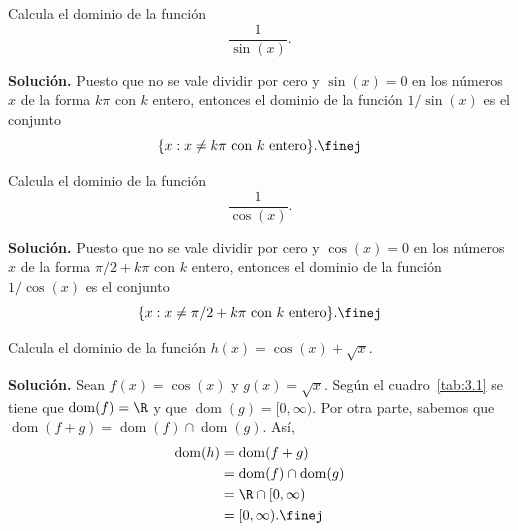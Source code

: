 \documentclass[12pt,a4paper]{book}
\DeclareMathOperator{\dom}{dom}
\begin{document}
    \begin{ejemplo}\label{ejm:15}
        Calcula el dominio de la función
        \begin{equation*}
            \frac{1}{\sin(x)}.
        \end{equation*}

        \textbf{Solución.} Puesto que no se vale dividir por cero y $\sin(x)=0$ en los
        números $x$ de la forma $k\pi$ con $k$ entero, entonces el dominio de la función
        $1/\sin(x)$ es el conjunto
        \begin{equation*}
            \{x:x\neq k\pi\text{ con }k\text{ entero}\}.\finej
        \end{equation*}
    \end{ejemplo}

    \begin{ejemplo}\label{ejm:16}
        Calcula el dominio de la función
        \begin{equation*}
            \frac{1}{\cos(x)}.
        \end{equation*}

        \textbf{Solución.} Puesto que no se vale dividir por cero y $\cos(x)=0$ en los
        números $x$ de la forma $\pi/2+k\pi$ con $k$ entero, entonces el dominio de la
        función $1/\cos(x)$ es el conjunto
        \begin{equation*}
            \{x:x\neq\pi/2+k\pi\text{ con }k\text{ entero}\}.\finej
        \end{equation*}
    \end{ejemplo}

    \begin{ejemplo}\label{ejm:17}
        Calcula el dominio de la función $h(x)=\cos(x)+\sqrt{x}$.

        \textbf{Solución.} Sean $f(x)=\cos(x)$ y $g(x)=\sqrt{x}$. Según el cuadro~\ref{tab:3.1} se
        tiene que $\dom(f)=\R$ y que $\dom(g)=[0,\infty)$. Por otra parte, sabemos que
        $\dom(f+g)=\dom(f)\cap\dom(g)$. Así,
        \begin{align*}
            \dom(h)&=\dom(f+g)\\
            &=\dom(f)\cap\dom(g)\\
            &=\R\cap[0,\infty)\\
            &=[0,\infty).\finej
        \end{align*}
    \end{ejemplo}
\end{document}
